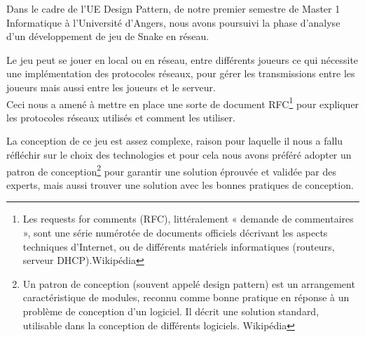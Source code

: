 \par
Dans le cadre de l'UE Design Pattern, de notre premier semestre de Master 1 Informatique à l'Université d'Angers, nous avons poursuivi la phase d'analyse d'un développement de jeu de Snake en réseau.

\par
Le jeu peut se jouer en local ou en réseau, entre différents joueurs ce qui nécessite une implémentation des protocoles réseaux, pour gérer les transmissions entre les joueurs mais aussi entre les joueurs et le serveur.\\
Ceci nous a amené à mettre en place une sorte de document RFC\footnote{Les requests for comments (RFC), littéralement « demande de commentaires », sont une série numérotée de documents officiels décrivant les aspects techniques d'Internet, ou de différents matériels informatiques (routeurs, serveur DHCP).Wikipédia} pour expliquer les protocoles réseaux utilisés et comment les utiliser.

\par
La conception de ce jeu est assez complexe, raison pour laquelle il nous a fallu réfléchir sur le choix des technologies et pour cela nous avons préféré adopter un patron de conception\footnote{Un patron de conception (souvent appelé design pattern) est un arrangement caractéristique de modules, reconnu comme bonne pratique en réponse à un problème de conception d'un logiciel. Il décrit une solution standard, utilisable dans la conception de différents logiciels. Wikipédia} pour garantir une solution éprouvée et validée par des experts, mais aussi trouver une solution avec les bonnes pratiques de conception.
